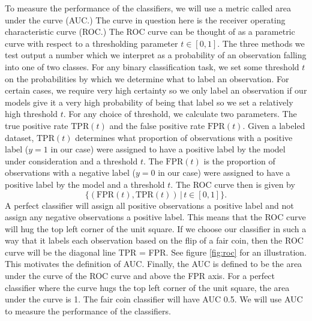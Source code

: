 \documentclass{article}
\begin{document}
To measure the performance of the classifiers, we will use a metric called area under the curve (AUC.) The curve in question here is the receiver operating characteristic curve (ROC.) The ROC curve can be thought of as a parametric curve with respect to a thresholding parameter $t \in [0, 1].$ The three methods we test output a number which we interpret as a probability of an observation falling into one of two classes. For any binary classification task, we set some threshold $t$ on the probabilities by which we determine what to label an observation. For certain cases, we require very high certainty so we only label an observation if our models give it a very high probability of being that label so we set a relatively high threshold $t$. For any choice of threshold, we calculate two parameters. The true positive rate $\mathrm{TPR}(t)$ and the false positive rate $\mathrm{FPR}(t)$. Given a labeled dataset, $\mathrm{TPR}(t)$ determines what proportion of observations with a positive label ($y=1$ in our case) were assigned to have a positive label by the model under consideration and a threshold $t.$ The $\mathrm{FPR}(t)$ is the proportion of observations with a negative label ($y = 0$ in our case) were assigned to have a positive label by the model and a threshold $t.$ The ROC curve then is given by 
\[
    \{(\mathrm{FPR}(t), \mathrm{TPR}(t)) \, |\, t\in[0,1]\}.
\]
A perfect classifier will assign all positive observations a positive label and not assign any negative observations a positive label. This means that the ROC curve will hug the top left corner of the unit square. If we choose our classifier in such a way that it labels each observation based on the flip of a fair coin, then the ROC curve will be the diagonal line TPR = FPR. See figure \ref{fig:roc} for an illustration. This motivates the definition of AUC. Finally, the AUC is defined to be the area under the curve of the ROC curve and above the FPR axis. For a perfect classifier where the curve hugs the top left corner of the unit square, the area under the curve is 1. The fair coin classifier will have AUC 0.5. We will use AUC to measure the performance of the classifiers.
\end{document}
